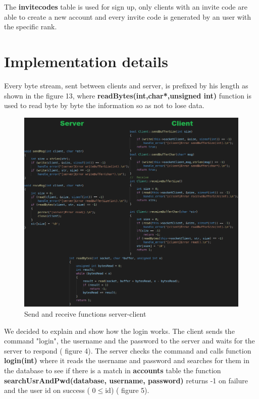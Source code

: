 \documentclass[runningheads]{llncs}
\begin{document}
\par The \textbf{invitecodes} table is used for sign up, only clients with an invite code are able to create a new account and every invite code is generated by an user with the specific rank.

\newpage
\section{Implementation details}
\par Every byte stream, sent between clients and server, is prefixed by his length as shown in the figure 13, where \textbf{readBytes(int,char*,unsigned int)} function is used to read byte by byte the information so as not to lose data. 


\begin{figure}[H]
\includegraphics[width=\textwidth,height=\textheight,keepaspectratio]{images/sendRecv.png}
\caption{Send and receive functions server-client}
\end{figure}

\newpage 
\par We decided to explain and show how the login works. The client sends the command "login", the username and the password to the server and waits for the server to respond ( figure 4). The server checks the command and calls function \textbf{login(int)} where it reads the username and password and searches for them in the database to see if there is a match in \textbf{accounts} table the function \textbf{searchUsrAndPwd(database, username, password)} returns -1 on failure and the user id on success ( 0$\leq$id) ( figure 5).
\end{document}
